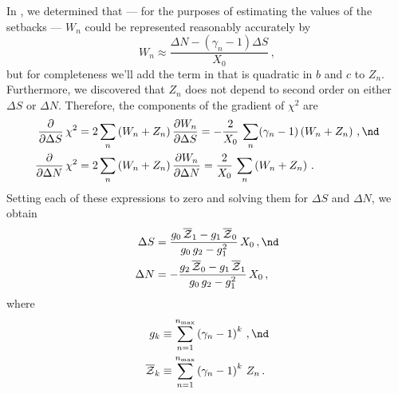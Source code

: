 In , we determined that --- for the purposes of estimating the values of the setbacks --- $W_n$ could be represented reasonably accurately by
\begin{equation} \label{eqn:w_n_approx}
  W_n \approx \frac{\Delta N - \left(\gamma_n - 1\right) \Delta S}{X_0}\, ,
\end{equation}
but for completeness we'll add the term in  that is quadratic in $b$ and $c$ to $Z_n$. Furthermore, we discovered that $Z_n$ does not depend to second order on either $\Delta S$ or $\Delta N$. Therefore, the components of the gradient of $\chi^2$ are
\begin{subequations} \label{chi2_grad}
  \begin{align}
    \frac{\partial}{\partial \Delta S}\, \chi^2 &= 2 \sum_n \left(W_n + Z_n\right)\frac{\partial W_n}{\partial \Delta S} = -\frac{2}{X_0}\, \sum_n (\gamma_n - 1) \left(W_n + Z_n\right)\, , \nd \\
    \frac{\partial}{\partial \Delta N}\, \chi^2 &= 2 \sum_n \left(W_n + Z_n\right)\frac{\partial W_n}{\partial \Delta N} = \frac{2}{X_0}\, \sum_n \left(W_n + Z_n\right)\, .
  \end{align}
\end{subequations}
Setting each of these expressions to zero and solving them for $\Delta S$ and $\Delta N$, we obtain
\begin{subequations} \label{eqn:rms_sol}
  \begin{align}
    \label{eqn:rms_sol_ds} \Delta S &= \frac{g_0\, \overline{\mathcal{Z}}_1 - g_1\, \overline{\mathcal{Z}}_0}{g_0\, g_2 - g_1^2}\, X_0\, , \nd \\
    \label{eqn:rms_sol_dn} \Delta N &= -\frac{g_2\, \overline{\mathcal{Z}}_0 - g_1\, \overline{\mathcal{Z}}_1}{g_0\, g_2 - g_1^2}\, X_0\, ,
  \end{align}
\end{subequations}
where
\begin{align}
  g_k &\equiv \sum_{n = 1}^{n_\text{max}} \left(\gamma_n - 1\right)^k\, , \nd \\
  \overline{\mathcal{Z}}_k &\equiv \sum_{n = 1}^{n_\text{max}} \left(\gamma_n - 1\right)^k\, Z_n\, .
\end{align}

